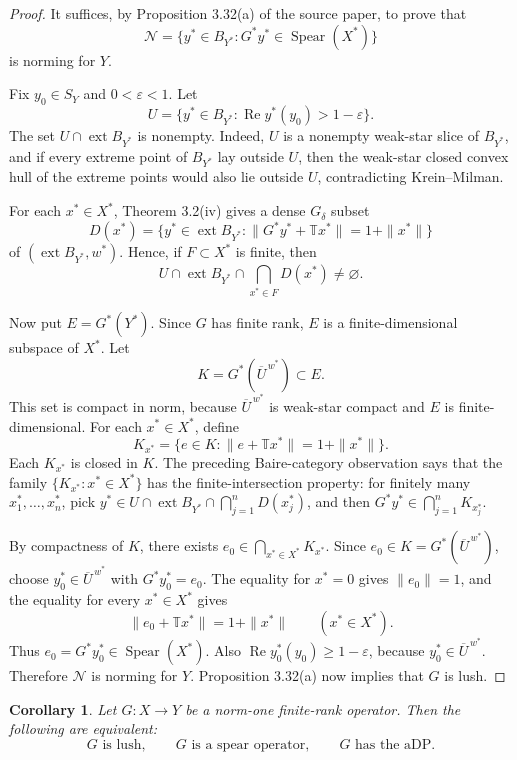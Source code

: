 \documentclass[11pt]{article}
\newtheorem{corollary}{Corollary}
\newcommand{\T}{\mathbb T}
\newcommand{\Spear}{\operatorname{Spear}}
\newcommand{\ext}{\operatorname{ext}}
\newcommand{\Rea}{\operatorname{Re}}
\begin{document}
\begin{proof}
It suffices, by Proposition 3.32(a) of the source paper, to prove that
\[
\mathcal N=\{y^*\in B_{Y^*}:G^*y^*\in \Spear(X^*)\}
\]
is norming for \(Y\).

Fix \(y_0\in S_Y\) and \(0<\varepsilon<1\).  Let
\[
U=\{y^*\in B_{Y^*}:\Rea y^*(y_0)>1-\varepsilon\}.
\]
The set \(U\cap \ext B_{Y^*}\) is nonempty.  Indeed, \(U\) is a nonempty
weak-star slice of \(B_{Y^*}\), and if every extreme point of \(B_{Y^*}\)
lay outside \(U\), then the weak-star closed convex hull of the extreme
points would also lie outside \(U\), contradicting Krein--Milman.

For each \(x^*\in X^*\), Theorem 3.2(iv) gives a dense \(G_\delta\) subset
\[
D(x^*)=\{y^*\in \ext B_{Y^*}:
\|G^*y^*+\T x^*\|=1+\|x^*\|\}
\]
of \((\ext B_{Y^*},w^*)\).  Hence, if \(F\subset X^*\) is finite, then
\[
U\cap \ext B_{Y^*}\cap \bigcap_{x^*\in F}D(x^*)\ne\varnothing .
\]

Now put \(E=G^*(Y^*)\).  Since \(G\) has finite rank, \(E\) is a
finite-dimensional subspace of \(X^*\).  Let
\[
K=G^*(\overline U^{\,w^*})\subset E.
\]
This set is compact in norm, because \(\overline U^{\,w^*}\) is weak-star
compact and \(E\) is finite-dimensional.  For each \(x^*\in X^*\), define
\[
K_{x^*}=\{e\in K:\|e+\T x^*\|=1+\|x^*\|\}.
\]
Each \(K_{x^*}\) is closed in \(K\).  The preceding Baire-category
observation says that the family \(\{K_{x^*}:x^*\in X^*\}\) has the
finite-intersection property: for finitely many \(x_1^*,\ldots,x_n^*\), pick
\(y^*\in U\cap \ext B_{Y^*}\cap\bigcap_{j=1}^nD(x_j^*)\), and then
\(G^*y^*\in\bigcap_{j=1}^nK_{x_j^*}\).

By compactness of \(K\), there exists \(e_0\in\bigcap_{x^*\in X^*}K_{x^*}\).
Since \(e_0\in K=G^*(\overline U^{\,w^*})\), choose
\(y_0^*\in\overline U^{\,w^*}\) with \(G^*y_0^*=e_0\).  The equality for
\(x^*=0\) gives \(\|e_0\|=1\), and the equality for every \(x^*\in X^*\)
gives
\[
\|e_0+\T x^*\|=1+\|x^*\|\qquad (x^*\in X^*).
\]
Thus \(e_0=G^*y_0^*\in \Spear(X^*)\).  Also
\(\Rea y_0^*(y_0)\ge 1-\varepsilon\), because
\(y_0^*\in \overline U^{\,w^*}\).  Therefore \(\mathcal N\) is norming for
\(Y\).  Proposition 3.32(a) now implies that \(G\) is lush.
\end{proof}

\begin{corollary}
Let \(G:X\to Y\) be a norm-one finite-rank operator.  Then the following
are equivalent:
\[
G\text{ is lush},\qquad
G\text{ is a spear operator},\qquad
G\text{ has the aDP}.
\]
\end{corollary}
\end{document}
